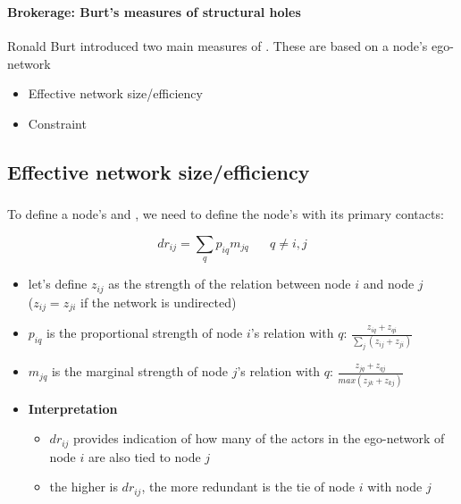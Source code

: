 \documentclass[8pt]{beamer}
\begin{document}



\begin{frame}
\frametitle{\insertsection}
\framesubtitle{Brokerage: Burt's measures of structural holes}

Ronald Burt introduced two main measures of {\color{blue}{structural holes}}. These are based on a node's ego-network \cite{Burt1992}

\medskip

\begin{itemize}
	\item Effective network size/efficiency
	\item Constraint
\end{itemize}
		
\end{frame}

\subsection{Effective network size/efficiency}

\begin{frame}
\frametitle{\insertsection}
\framesubtitle{\insertsubsection}


To define a node's {\color{blue}{effective network size}} and {\color{blue}{efficiency}}, we need to define the node's {\color{blue}{dyadic redundancy}}  with its primary contacts:

\begin{equation*}
dr_{ij} = \sum_{q}{p_{iq}m_{jq}} \;\;\;\;\;\; q \neq i, j
\end{equation*}

\begin{itemize}
	\item let's define $z_{ij}$ as the strength of the relation between node $i$ and node $j$ \\
	($z_{ij}=z_{ji}$ if the network is undirected)
	\item $p_{iq}$ is the proportional strength of node $i$'s relation with $q$: $\frac{z_{iq}+z_{qi}}{\sum_{j}(z_{ij}+z_{ji})}$
	\item $m_{jq}$ is the marginal strength of node $j$'s relation with $q$: $\frac{z_{jq}+z_{qj}}{max(z_{jk}+z_{kj})}$
	\item \textbf{Interpretation}
	\begin{itemize}
	\item $dr_{ij}$ provides indication of how many of the  actors in the ego-network of node $i$ are also tied to node $j$
	\item the higher is $dr_{ij}$, the more redundant is the tie of node $i$ with node $j$
	\end{itemize}
\end{itemize}
		
\end{frame}
\end{document}
